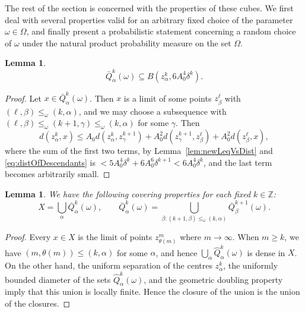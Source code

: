 \documentclass{amsart}
\numberwithin{equation}{section}
\theoremstyle{plain}
\newtheorem{lemma}[equation]{Lemma}
\theoremstyle{definition}
\theoremstyle{remark}
\begin{document}
{{The rest of the section is concerned with the properties of these cubes. We first deal with several properties valid for an arbitrary fixed choice of the parameter $\omega\in\Omega$, and finally present a probabilistic statement concerning a random choice of $\omega$ under the natural product probability measure on the set $\Omega$.

\begin{lemma}\label{lem:cubeVsCentre}
\begin{equation*}
  \bar{Q}^k_{\alpha}(\omega)\subseteq B(z^k_{\alpha},6A_0^4\delta^k).
\end{equation*}
\end{lemma}

\begin{proof}
Let $x\in\bar{Q}^k_{\alpha}(\omega)$. Then $x$ is a limit of some points $z^{\ell}_{\beta}$ with $(\ell,\beta)\leq_{\omega}(k,\alpha)$, and we may choose a subsequence with $(\ell,\beta)\leq_{\omega}(k+1,\gamma)\leq_{\omega}(k,\alpha)$ for some $\gamma$. Then
\begin{equation*}
  d(z^k_{\alpha},x)
  \leq A_0 d(z^k_{\alpha},z^{k+1}_{\gamma})+A_0^2 d(z^{k+1}_{\gamma},z^{\ell}_{\beta})+ A_0^2 d(z^{\ell}_{\beta},x),
\end{equation*}
where the sum of the first two terms, by Lemma~\ref{lem:newLeqVsDist} and \eqref{eq:distOfDescendants} is $<5A_0^4 \delta^k+6A_0^6\delta^{k+1}<6A_0^4\delta^k$, and the last term becomes arbitrarily small.
\end{proof}

\begin{lemma}
We have the following covering properties for each fixed $k\in{\mathbb{Z}}$:
\begin{equation*}
  X=\bigcup_{\alpha}\bar{Q}^k_{\alpha}(\omega),\qquad
  \bar{Q}^k_{\alpha}(\omega)=\bigcup_{\beta:(k+1,\beta)\leq_{\omega}(k,\alpha)}\bar{Q}^{k+1}_{\beta}(\omega).
\end{equation*}
\end{lemma}

\begin{proof}
Every $x\in X$ is the limit of points $z^m_{\theta(m)}$ where $m\to\infty$. When $m\geq k$, we have $(m,\theta(m))\leq(k,\alpha)$ for some $\alpha$, and hence $\bigcup_\alpha\hat{Q}^k_\alpha(\omega)$ is dense in $X$. On the other hand, the uniform separation of the centres $z^k_\alpha$, the uniformly bounded diameter of the sets $\hat{Q}^k_\alpha(\omega)$, and the geometric doubling property imply that this union is locally finite. Hence the closure of the union is the union of the closures.


\end{proof}}}
\end{document}

